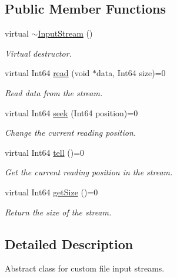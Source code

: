 \subsection*{Public Member Functions}
\begin{DoxyCompactItemize}
\item 
\mbox{\label{classsf_1_1_input_stream_a4b2eb0f92323e630bd0542bc6191682e}} 
virtual \hyperlink{classsf_1_1_input_stream_a4b2eb0f92323e630bd0542bc6191682e}{$\sim$\+Input\+Stream} ()
\begin{DoxyCompactList}\small\item\em Virtual destructor. \end{DoxyCompactList}\item 
virtual Int64 \hyperlink{classsf_1_1_input_stream_a8dd89c74c1acb693203f50e750c6ae53}{read} (void $\ast$data, Int64 size)=0
\begin{DoxyCompactList}\small\item\em Read data from the stream. \end{DoxyCompactList}\item 
virtual Int64 \hyperlink{classsf_1_1_input_stream_a76aba8e5d5cf9b1c5902d5e04f7864fc}{seek} (Int64 position)=0
\begin{DoxyCompactList}\small\item\em Change the current reading position. \end{DoxyCompactList}\item 
virtual Int64 \hyperlink{classsf_1_1_input_stream_a599515b9ccdbddb6fef5a98424fd559c}{tell} ()=0
\begin{DoxyCompactList}\small\item\em Get the current reading position in the stream. \end{DoxyCompactList}\item 
virtual Int64 \hyperlink{classsf_1_1_input_stream_a311eaaaa65d636728e5153b574b72d5d}{get\+Size} ()=0
\begin{DoxyCompactList}\small\item\em Return the size of the stream. \end{DoxyCompactList}\end{DoxyCompactItemize}


\subsection{Detailed Description}
Abstract class for custom file input streams. 

